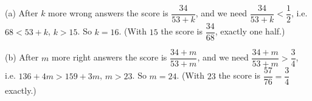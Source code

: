 (a) After $k$ more wrong answers the score is $\dfrac{34}{53+k}$, and we need $\dfrac{34}{53+k}<\dfrac{1}{2}$, i.e. $68<53+k$, $k>15$. So $k=\boxed{16}$. (With $15$ the score is $\dfrac{34}{68}$, exactly one half.)

(b) After $m$ more right answers the score is $\dfrac{34+m}{53+m}$, and we need $\dfrac{34+m}{53+m}>\dfrac{3}{4}$, i.e. $136+4m>159+3m$, $m>23$. So $m=\boxed{24}$. (With $23$ the score is $\dfrac{57}{76}=\dfrac{3}{4}$ exactly.)
